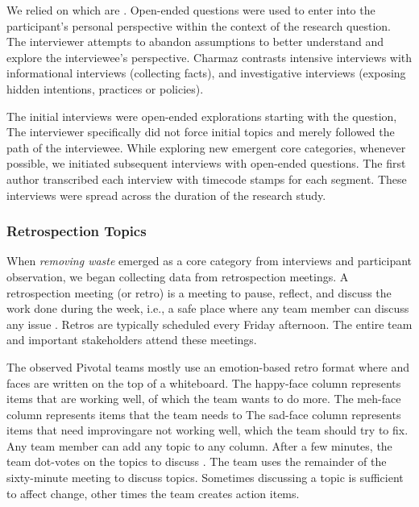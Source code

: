 We relied on  which are  \cite{Charmaz}. Open-ended questions were used to enter into the participant's personal perspective within the context of the research question. The interviewer attempts to abandon assumptions to better understand and explore the interviewee's perspective. Charmaz \cite{Charmaz} contrasts intensive interviews with informational interviews (collecting facts), and investigative interviews (exposing hidden intentions, practices or policies).

The initial interviews were open-ended explorations starting with the question,  The interviewer specifically did not force initial topics and merely followed the path of the interviewee. While exploring new emergent core categories, whenever possible, we initiated subsequent interviews with open-ended questions. The first author transcribed each interview with timecode stamps for each segment. These interviews were spread across the duration of the research study. 
\subsubsection{Retrospection Topics}
When \textit{removing waste} emerged as a core category from interviews and participant observation, we began collecting data from retrospection meetings. A retrospection meeting (or retro) is a meeting to pause, reflect, and discuss the work done during the week, i.e., a safe place where any team member can discuss any issue \cite{DerbyAgileRetrospectives}. Retros are typically scheduled every Friday afternoon. The entire team and important stakeholders attend these meetings. 

The observed Pivotal teams mostly use an emotion-based retro format where   and  faces are written on the top of a whiteboard. The happy-face column represents items that are working well, of which the team wants to do more. The meh-face column represents  items that the team needs to  The sad-face column represents items that need improvingare not working well, which the team should try to fix. Any team member can add any topic to any column. After a few minutes, the team dot-votes on the topics to discuss \cite{DerbyAgileRetrospectives}. The team uses the remainder of the sixty-minute meeting to discuss topics. Sometimes discussing a topic is sufficient to affect change, other times the team creates action items. 

